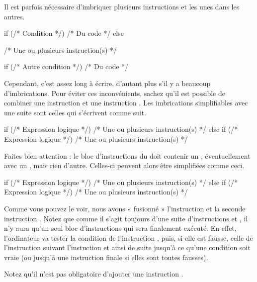Il est parfois nécessaire d'imbriquer plusieurs instructions 
et  les unes dans les autres.

\begin{C}
if (/* Condition */)
{
    /* Du code */
}
else
{
    /* Une ou plusieurs instruction(s) */

    if (/* Autre condition */)
    {
        /* Du code */
    }
}
\end{C}

Cependant, c'est assez long à écrire, d'autant plus s'il y a beaucoup
d'imbrications. Pour éviter ces inconvénients, sachez qu'il est possible
de combiner une instruction  et une instruction
. Les imbrications simplifiables avec une suite 
 sont celles qui s'écrivent comme suit.

\begin{C}
if (/* Expression logique */)
{
    /* Une ou plusieurs instruction(s) */
}
else 
{
    if (/* Expression logique */)
    {
        /* Une ou plusieurs instruction(s) */
    }
}
\end{C}

Faites bien attention : le bloc d'instructions du  doit
contenir un , éventuellement avec un , mais rien
d'autre. Celles-ci peuvent alors être simplifiées comme ceci.

\begin{C}
if (/* Expression logique */)
{
    /* Une ou plusieurs instruction(s) */
}
else if (/* Expression logique */)
{
    /* Une ou plusieurs instruction(s) */
}
\end{C}

Comme vous pouvez le voir, nous avons « fusionné » l'instruction
 et la seconde instruction . Notez que comme il
s'agit toujours d'une suite d'instructions  et ,
il n'y aura qu'un seul bloc d'instructions qui sera finalement exécuté.
En effet, l'ordinateur va tester la condition de l'instruction
, puis, si elle est fausse, celle de l'instruction
 suivant l'instuction  et ainsi de suite jusqu'à
ce qu'une condition soit vraie (ou jusqu'à une instruction 
finale si elles sont toutes fausses).

\begin{infobox} Notez qu'il n'est pas obligatoire
d'ajouter une instruction .
\end{infobox}

